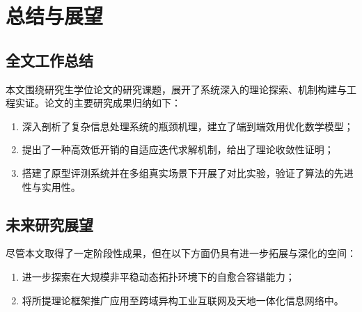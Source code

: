 
\chapter{总结与展望}

\section{全文工作总结}

本文围绕研究生学位论文的研究课题，展开了系统深入的理论探索、机制构建与工程实证。论文的主要研究成果归纳如下：
\begin{enumerate}[leftmargin=2.5em, itemsep=4pt, label=（\arabic*）]
  \item 深入剖析了复杂信息处理系统的瓶颈机理，建立了端到端效用优化数学模型；
  \item 提出了一种高效低开销的自适应迭代求解机制，给出了理论收敛性证明；
  \item 搭建了原型评测系统并在多组真实场景下开展了对比实验，验证了算法的先进性与实用性。
\end{enumerate}

\section{未来研究展望}

尽管本文取得了一定阶段性成果，但在以下方面仍具有进一步拓展与深化的空间：
\begin{enumerate}[leftmargin=2.5em, itemsep=4pt, label=（\arabic*）]
  \item 进一步探索在大规模非平稳动态拓扑环境下的自愈合容错能力；
  \item 将所提理论框架推广应用至跨域异构工业互联网及天地一体化信息网络中。
\end{enumerate}
